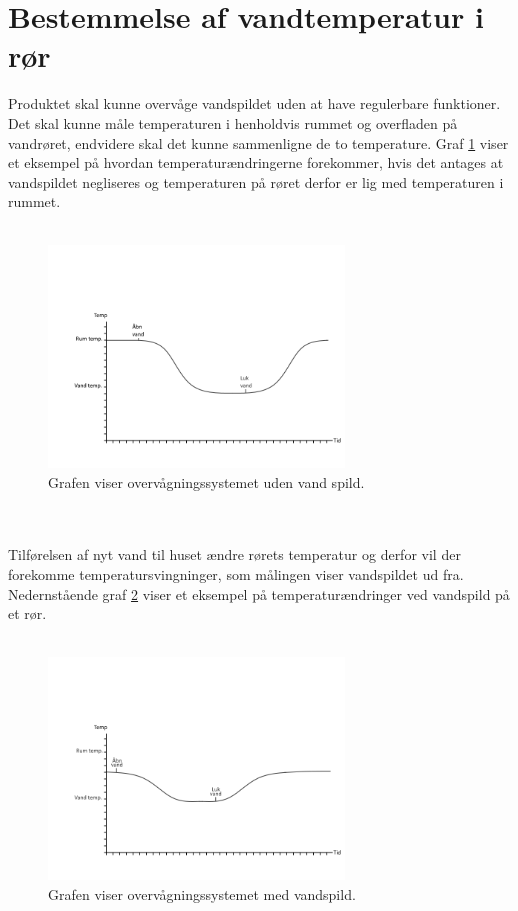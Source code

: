 \section{Bestemmelse af vandtemperatur i rør}
Produktet skal kunne overvåge vandspildet uden at have regulerbare funktioner. Det skal kunne måle temperaturen i henholdvis rummet og  overfladen på vandrøret, endvidere skal det kunne sammenligne de to temperature.
Graf \ref{vandspild_graf_normal} viser et eksempel på hvordan temperaturændringerne forekommer, hvis det antages at vandspildet negliseres og temperaturen på røret derfor er lig med temperaturen i rummet.   
\\
\\
\begin{figure}[h!]
  \centering
  \includegraphics[width=0.7\textwidth]{figures/vandspild_graf_normal.png}
  \caption{Grafen viser overvågningssystemet uden vand spild.}
  \label{vandspild_graf_normal}
\end{figure}
\\
\\
Tilførelsen af nyt vand til huset ændre rørets temperatur og derfor vil der forekomme temperatursvingninger, som målingen viser vandspildet ud fra. Nedernstående graf \ref{vandspild_graf_spild} viser et eksempel på temperaturændringer ved vandspild på et rør.
\\
\\
\begin{figure}[h!]
  \centering
  \includegraphics[width=0.7\textwidth]{figures/vandspild_graf_spild.png}
  \caption{Grafen viser overvågningssystemet med vandspild.}
  \label{vandspild_graf_spild}
\end{figure}
